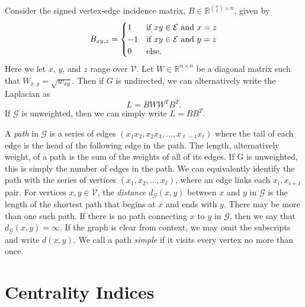 \documentclass[10]{report}
\begin{document}
Consider the signed vertex-edge incidence matrix, $B \in \mathbb{R}^{{n \choose 2} \times n}$, given by
%
\begin{equation} \label{eq:veim}
B_{xy,z} = 
\begin{cases}
1 & \textnormal{if $xy \in \mathcal{E}$ and $x=z$} \\
-1 & \textnormal{if $xy \in \mathcal{E}$ and $y=z$} \\
0 & \textnormal{else}.
\end{cases}
\end{equation}
%
Here we let $x$, $y$, and $z$ range over $\mathcal{V}$. 
Let $W \in \mathbb{R}^{n \times n}$ be a diagonal matrix such that $W_{x,y} = \sqrt{w_{xy}}$.
Then if $G$ is undirected, we can alternatively write the Laplacian as 
%
\begin{equation} \label{eq:laplacian}
L = BWW^TB^T.
\end{equation}
%
If $\mathcal{G}$ is unweighted, then we can simply write $L = BB^T$. 

A \emph{path} in $\mathcal{G}$ is a series of edges $(x_1 x_2, x_2 x_3, \dots, x_{\ell -1} x_\ell)$ where the tail of each edge is the head of the following edge in the path. 
The length, alternatively weight, of a path is the sum of the weights of all of its edges.
If G is unweighted, this is simply the number of edges in the path.
We can equivalently identify the path with the series of vertices $(x_1, x_2, \dots, x_\ell)$, where an edge links each $x_i, x_{i+1}$ pair.
For vertices $x,y \in \mathcal{V}$, the \emph{distance} $d_\mathcal{G}(x,y)$ between $x$ and $y$ in $\mathcal{G}$ is the length of the shortest path that begins at $x$ and ends with $y$. 
There may be more than one such path. 
If there is no path connecting $x$ to $y$ in $\mathcal{G}$, then we say that $d_\mathcal{G}(x,y) = \infty$. 
If the graph is clear from context, we may omit the subscripts and write $d(x,y)$.
We call a path \emph{simple} if it visits every vertex no more than once. 


\section{Centrality Indices} \label{sec:centrality}
\end{document}
